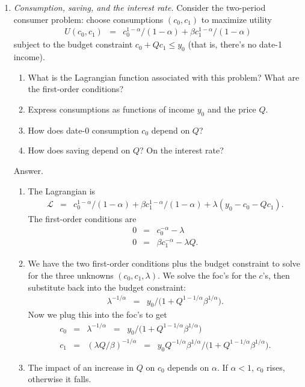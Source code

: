 \documentclass[11pt]{article}
\begin{document}
\begin{enumerate}
\item {\it Consumption, saving, and the interest rate.\/}
Consider the two-period consumer problem:  choose consumptions $(c_0,c_1)$
to maximize utility
\begin{eqnarray*}
    U(c_0,c_1) &=& c_0^{1-\alpha}/(1-\alpha) + \beta c_1^{1-\alpha}/(1-\alpha)
\end{eqnarray*}
subject to the budget constraint $ c_0 + Q c_1 \leq y_0 $
(that is, there's no date-1 income).  %
%
\begin{enumerate}
\item What is the Lagrangian function associated with this problem?
What are the first-order conditions?
\item Express consumptions as functions of income $y_0$ and the
price $Q$.
\item How does date-0 consumption $c_0$ depend on $Q$?
\item How does saving depend on $Q$?  On the interest rate?
\end{enumerate}
%
Answer.
\begin{enumerate}
\item The Lagrangian is
\begin{eqnarray*}
    \mathcal{L} &=& c_0^{1-\alpha}/(1-\alpha) + \beta c_1^{1-\alpha}/(1-\alpha)
            + \lambda (y_0 - c_0 - Q c_1 ).
\end{eqnarray*}
The first-order conditions are
\begin{eqnarray*}
        0 &=& c_0^{-\alpha} - \lambda \\
        0 &=& \beta c_1^{-\alpha} - \lambda Q .
\end{eqnarray*}
\item We have the two first-order conditions plus the budget constraint
to solve for the three unknowns $(c_0,c_1,\lambda)$.
We solve the foc's for the $c$'s, then substitute back into the budget constraint:
\begin{eqnarray*}
    \lambda^{-1/\alpha} &=& y_0/ \big( 1 + Q^{1-1/\alpha} \beta^{1/\alpha} \big) .
\end{eqnarray*}
Now we plug this into the foc's to get
\begin{eqnarray*}
    c_0 &=& \lambda^{-1/\alpha}  \;\;=\;\;
            y_0/ \big( 1 + Q^{1-1/\alpha} \beta^{1/\alpha} \big) \\
    c_1 &=& (\lambda Q/\beta)^{-1/\alpha}  \;\;=\;\;
            y_0 Q^{-1/\alpha} \beta^{1/\alpha} / \big( 1 + Q^{1-1/\alpha} \beta^{1/\alpha} \big).
\end{eqnarray*}
\item The impact of an increase in $Q$ on $c_0$ depends on $\alpha$.
If $\alpha<1$, $c_0$ rises, otherwise it falls.


\end{enumerate}
\end{enumerate}
\end{document}
